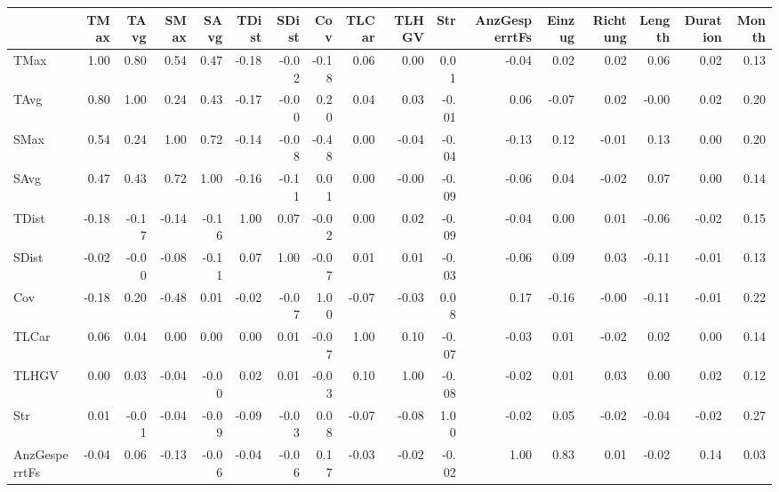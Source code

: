 \begin{tabular}{lrrrrrrrrrrrrrrrr}
\toprule
{} &  TMax &  TAvg &  SMax &  SAvg &  TDist &  SDist &   Cov &  TLCar &  TLHGV &   Str &  AnzGesperrtFs &  Einzug &  Richtung &  Length &  Duration &  Month \\
\midrule
TMax          &  1.00 &  0.80 &  0.54 &  0.47 &  -0.18 &  -0.02 & -0.18 &   0.06 &   0.00 &  0.01 &          -0.04 &    0.02 &      0.02 &    0.06 &      0.02 &   0.13 \\
TAvg          &  0.80 &  1.00 &  0.24 &  0.43 &  -0.17 &  -0.00 &  0.20 &   0.04 &   0.03 & -0.01 &           0.06 &   -0.07 &      0.02 &   -0.00 &      0.02 &   0.20 \\
SMax          &  0.54 &  0.24 &  1.00 &  0.72 &  -0.14 &  -0.08 & -0.48 &   0.00 &  -0.04 & -0.04 &          -0.13 &    0.12 &     -0.01 &    0.13 &      0.00 &   0.20 \\
SAvg          &  0.47 &  0.43 &  0.72 &  1.00 &  -0.16 &  -0.11 &  0.01 &   0.00 &  -0.00 & -0.09 &          -0.06 &    0.04 &     -0.02 &    0.07 &      0.00 &   0.14 \\
TDist         & -0.18 & -0.17 & -0.14 & -0.16 &   1.00 &   0.07 & -0.02 &   0.00 &   0.02 & -0.09 &          -0.04 &    0.00 &      0.01 &   -0.06 &     -0.02 &   0.15 \\
SDist         & -0.02 & -0.00 & -0.08 & -0.11 &   0.07 &   1.00 & -0.07 &   0.01 &   0.01 & -0.03 &          -0.06 &    0.09 &      0.03 &   -0.11 &     -0.01 &   0.13 \\
Cov           & -0.18 &  0.20 & -0.48 &  0.01 &  -0.02 &  -0.07 &  1.00 &  -0.07 &  -0.03 &  0.08 &           0.17 &   -0.16 &     -0.00 &   -0.11 &     -0.01 &   0.22 \\
TLCar         &  0.06 &  0.04 &  0.00 &  0.00 &   0.00 &   0.01 & -0.07 &   1.00 &   0.10 & -0.07 &          -0.03 &    0.01 &     -0.02 &    0.02 &      0.00 &   0.14 \\
TLHGV         &  0.00 &  0.03 & -0.04 & -0.00 &   0.02 &   0.01 & -0.03 &   0.10 &   1.00 & -0.08 &          -0.02 &    0.01 &      0.03 &    0.00 &      0.02 &   0.12 \\
Str           &  0.01 & -0.01 & -0.04 & -0.09 &  -0.09 &  -0.03 &  0.08 &  -0.07 &  -0.08 &  1.00 &          -0.02 &    0.05 &     -0.02 &   -0.04 &     -0.02 &   0.27 \\
AnzGesperrtFs & -0.04 &  0.06 & -0.13 & -0.06 &  -0.04 &  -0.06 &  0.17 &  -0.03 &  -0.02 & -0.02 &           1.00 &    0.83 &      0.01 &   -0.02 &      0.14 &   0.03 \\

\end{tabular}
